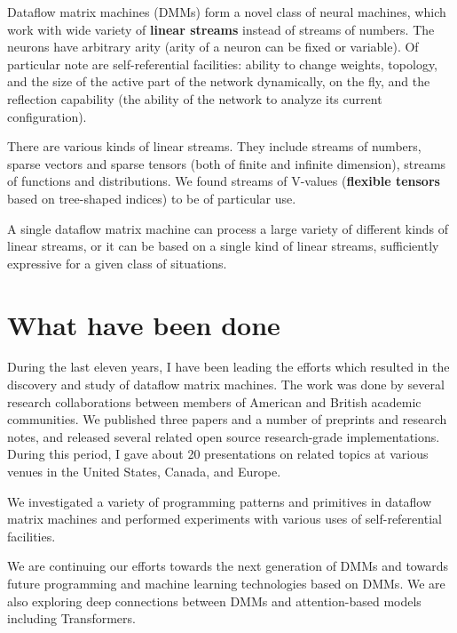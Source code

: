 \documentclass{article}
\begin{document}
\vspace{0.1in}
\noindent
Dataflow matrix machines (DMMs) form a novel class of neural machines, which work with wide variety
of {\bf linear streams} instead of streams of numbers. The neurons have
arbitrary arity (arity of a neuron can be fixed or variable). Of particular note are
self-referential facilities: ability to change weights, topology, and the size of the active part of the network dynamically, on the fly,
and the reflection capability (the ability of the network to analyze its current configuration).

\vspace{0.1in}
\noindent
There are various kinds of linear streams. They include streams of numbers, sparse vectors and sparse tensors (both of
finite and infinite dimension), streams of functions and distributions. We found streams of V-values
({\bf flexible tensors} based on tree-shaped indices) to be of particular use.

\vspace{0.1in}
\noindent
A single dataflow matrix machine can process a large variety of different kinds of linear streams, or
it can be based on a single kind of linear streams, sufficiently expressive for a given class of situations.

\section{What have been done}

During the last eleven years, I have been leading the efforts which resulted in
the discovery and study of dataflow matrix machines. The work was done by
several research collaborations between members of American and British 
academic communities. We published three papers and a number of preprints and
research notes, and released several related open source research-grade
implementations. During this period, I gave about 20 presentations on 
related topics at various venues in the United States, Canada, and Europe.

\vspace{0.1in}
\noindent
We investigated a variety of programming patterns and primitives in
dataflow matrix machines and performed experiments with various uses of self-referential
facilities.

\vspace{0.1in}
\noindent
We are continuing our efforts towards the next generation of DMMs 
and towards future programming and machine learning
technologies based on DMMs. We are also exploring 
deep connections between DMMs and attention-based models including Transformers.
\end{document}
